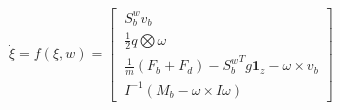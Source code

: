 \documentclass[preview]{standalone}
\begin{document}
\begin{center}
$\dot{\xi} = f(\xi, w) = \begin{bmatrix} \
                        S_b^w v_b \\ \
                        \frac{1}{2} q \bigotimes \omega \\ \
                        \frac{1}{m} (F_b + F_d) - {S_b^w}^T g \textbf{1}_z - \omega \times v_b \\ \
                        I^{-1} (M_b - \omega \times I \omega) \
                    \end{bmatrix}$
\end{center}
\end{document}
